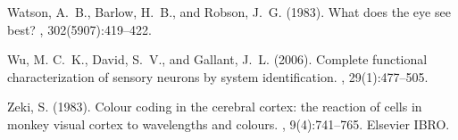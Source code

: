 \documentclass[a4paper,11pt]{article}%
\begin{document}
\begin{thebibliography}{}
Watson, A.~B., Barlow, H.~B., and Robson, J.~G. (1983).
\newblock What does the eye see best?
, 302(5907):419--422.

Wu, M. C.~K., David, S.~V., and Gallant, J.~L. (2006).
\newblock Complete functional characterization of sensory neurons by system
  identification.
, 29(1):477--505.

Zeki, S. (1983).
\newblock Colour coding in the cerebral cortex: the reaction of cells in monkey
  visual cortex to wavelengths and colours.
, 9(4):741--765.
\newblock Elsevier IBRO.

\end{thebibliography}
\end{document}
